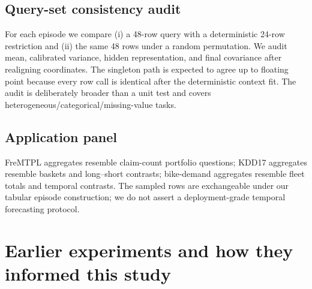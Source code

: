 

\subsection{Query-set consistency audit}

\begin{table}[h]
\caption{Maximum normalized discrepancies over 35 datasets and three context
sizes (one fold-0, replicate-0 episode each; 105 episodes).}
\label{tab:audit}
\centering

\end{table}

For each episode we compare (i) a 48-row query with a deterministic 24-row
restriction and (ii) the same 48 rows under a random permutation.  We audit
mean, calibrated variance, hidden representation, and final covariance after
realigning coordinates.  The singleton path is expected to agree up to
floating point because every row call is identical after the deterministic
context fit.  The audit is deliberately broader than a unit test and covers
heterogeneous/categorical/missing-value tasks.

\subsection{Application panel}\label{app:applications}

\begin{table}[h]
\caption{Held-out application results.  These three datasets do not enter the
35-dataset primary estimate or its hypothesis tests.}
\centering

\end{table}

FreMTPL aggregates resemble claim-count portfolio questions; KDD17 aggregates
resemble baskets and long--short contrasts; bike-demand aggregates resemble
fleet totals and temporal contrasts.  The sampled rows are exchangeable under
our tabular episode construction; we do not assert a deployment-grade temporal
forecasting protocol.

\section{Earlier experiments and how they informed this study}\label{app:prior}

